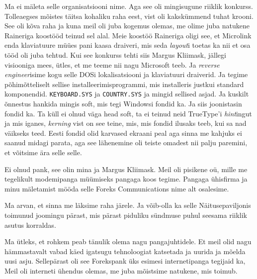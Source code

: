 Ma ei mäleta selle organisatsiooni nime. Aga  see oli mingisugune riiklik 
konkurss. Tolleaegses mõistes täitsa kohaliku raha eest, vist oli kakskümmend 
tuhat krooni. See oli kõva raha ja kuna meil oli juba kogemus olemas, me olime 
juba natukene Raineriga koostööd teinud sel alal. Meie koostöö Raineriga oligi 
see, et Microlink enda klaviatuure müües pani kaasa draiveri, mis seda 
\emph{layout}i  toetas ka nii et osa tööd oli juba tehtud. Kui see konkurss 
tehti siis Margus Kliimask, jällegi visiooniga 
mees, ütles, et me teeme nii nagu Microsoft teeb. Ja \emph{reverse 
engineer}isime  kogu selle DOSi lokalisatsiooni ja klaviatuuri draiverid. Ja 
tegime põhimõtteliselt sellise installeerimisprogrammi, mis installeris justkui 
standard komponendid.  \verb|KEYBOARD.SYS| ja \verb|COUNTRY.SYS| ja mingid 
sellised asjad. Ja kuskilt õnnestus hankida mingis soft, mis tegi Windowsi 
fondid ka. Ja siis joonistasin fondid ka. Ta küll ei olnud väga head soft, ta 
ei teinud neid TrueType'i \emph{hint}ingut ja mis iganes, \emph{kerning} vist 
on see teine, mis, mis fondid ilusaks teeb, kui sa nad väikseks teed. Eesti 
fondid olid karvased ekraani peal aga sinna me kahjuks ei saanud midagi parata, 
aga  see lähenemine oli teiste omadest nii palju paremini, et võitsime ära 
selle selle.


Ei olnud pank, see olin mina ja Margus Kliimask. 
Meil oli pisikene oü, mille me tegelikult modemipanga müümiseks pangaga koos 
tegime. Pangaga ühisfirma ja minu mäletamist mööda selle Foreks Communications 
nime alt osalesime. 


Ma arvan, et sinna me läksime raha järele. Ja võib-olla ka selle 
Näitusepaviljonis toimunud joomingu pärast, mis pärast piduliku sündmuse puhul 
seesama riiklik asutus korraldas.


Ma ütleks, et  rohkem peab tänulik olema nagu pangajuhtidele. Et meil olid nagu 
hämmastavalt vabad käed igatsugu tehnoloogiat katsetada ja uurida ja mõelda 
uusi asju. Sellepärast oli see Forekspank  üks esimesi internetipanga tegijaid 
ka, Meil oli interneti ühendus olemas, me juba mõistsime natukene, mis toimub. 


